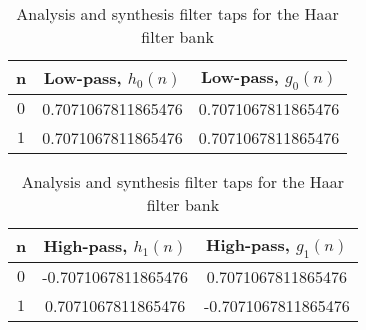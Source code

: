 \begin{table}[!htb]
    \centering
    \caption{Analysis and synthesis filter taps for the Haar filter bank}
    \label{tab:anal_synth_haar}
\begin{tabular}{ccc}
    \toprule
    n         & Low-pass, $h_{0}(n)$ & Low-pass, $g_{0}(n)$ \\
    \midrule
    $0$       & 0.7071067811865476  & 0.7071067811865476  \\
    $1$       & 0.7071067811865476  & 0.7071067811865476  \\
    \bottomrule
\end{tabular}

\bigskip
\bigskip

\begin{tabular}{ccc}
    \toprule
    n         & High-pass, $h_{1}(n)$ & High-pass, $g_{1}(n)$ \\
    \midrule
    $0$       & -0.7071067811865476  & 0.7071067811865476  \\
    $1$       & 0.7071067811865476  & -0.7071067811865476  \\
    \bottomrule
\end{tabular}
\end{table}

